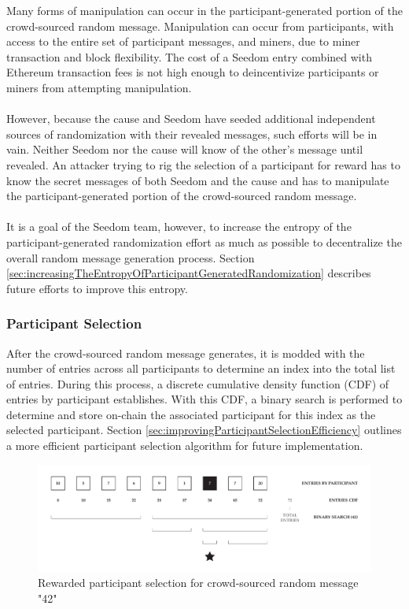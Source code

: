 \documentclass[11pt]{article}
\begin{document}
Many forms of manipulation can occur in the participant-generated portion of the crowd-sourced random message. Manipulation can occur from participants, with access to the entire set of participant messages, and miners, due to miner transaction and block flexibility. The cost of a Seedom entry combined with Ethereum transaction fees is not high enough to deincentivize participants or miners from attempting manipulation.\\\\
However, because the cause and Seedom have seeded additional independent sources of randomization with their revealed messages, such efforts will be in vain. Neither Seedom nor the cause will know of the other's message until revealed. An attacker trying to rig the selection of a participant for reward has to know the secret messages of both Seedom and the cause and has to manipulate the participant-generated portion of the crowd-sourced random message.\\\\
It is a goal of the Seedom team, however, to increase the entropy of the participant-generated randomization effort as much as possible to decentralize the overall random message generation process. Section \ref{sec:increasingTheEntropyOfParticipantGeneratedRandomization} describes future efforts to improve this entropy.

\subsubsection{Participant Selection}

After the crowd-sourced random message generates, it is modded with the number of entries across all participants to determine an index into the total list of entries. During this process, a discrete cumulative density function (CDF) of entries by participant establishes. With this CDF, a binary search is performed to determine and store on-chain the associated participant for this index as the selected participant. Section \ref{sec:improvingParticipantSelectionEfficiency} outlines a more efficient participant selection algorithm for future implementation.

\begin{figure}[H]
\begin{center}
\includegraphics[width=1.0\textwidth]{./graphics/rewarded-participant-selection.pdf}
\caption{Rewarded participant selection for crowd-sourced random message "42"}
\label{figure:participantSelection}
\end{center}
\end{figure}
\end{document}
